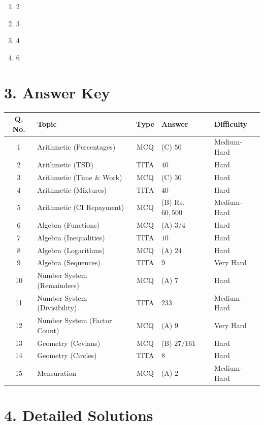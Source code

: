\documentclass[11pt]{article}
\begin{document}
\begin{enumerate}[label=(\Alph*)]
    \item \(2\)
    \item \(3\)
    \item \(4\)
    \item \(6\)
\end{enumerate}

\newpage
\section*{3. Answer Key}

\begin{longtable}{|c|l|c|l|l|}
\hline
\textbf{Q. No.} & \textbf{Topic} & \textbf{Type} & \textbf{Answer} & \textbf{Difficulty} \\
\hline
1 & Arithmetic (Percentages) & MCQ & (C) \(50\) & Medium-Hard \\
\hline
2 & Arithmetic (TSD) & TITA & \(40\) & Hard \\
\hline
3 & Arithmetic (Time \& Work) & MCQ & (C) \(30\) & Hard \\
\hline
4 & Arithmetic (Mixtures) & TITA & \(40\) & Hard \\
\hline
5 & Arithmetic (CI Repayment) & MCQ & (B) Rs.~\(60{,}500\) & Medium-Hard \\
\hline
6 & Algebra (Functions) & MCQ & (A) \(3/4\) & Hard \\
\hline
7 & Algebra (Inequalities) & TITA & \(10\) & Hard \\
\hline
8 & Algebra (Logarithms) & MCQ & (A) \(24\) & Hard \\
\hline
9 & Algebra (Sequences) & TITA & \(9\) & Very Hard \\
\hline
10 & Number System (Remainders) & MCQ & (A) \(7\) & Hard \\
\hline
11 & Number System (Divisibility) & TITA & \(233\) & Medium-Hard \\
\hline
12 & Number System (Factor Count) & MCQ & (A) \(9\) & Very Hard \\
\hline
13 & Geometry (Cevians) & MCQ & (B) \(27/161\) & Hard \\
\hline
14 & Geometry (Circles) & TITA & \(8\) & Hard \\
\hline
15 & Mensuration & MCQ & (A) \(2\) & Medium-Hard \\
\hline
\end{longtable}

\newpage
\section*{4. Detailed Solutions}
\end{document}

